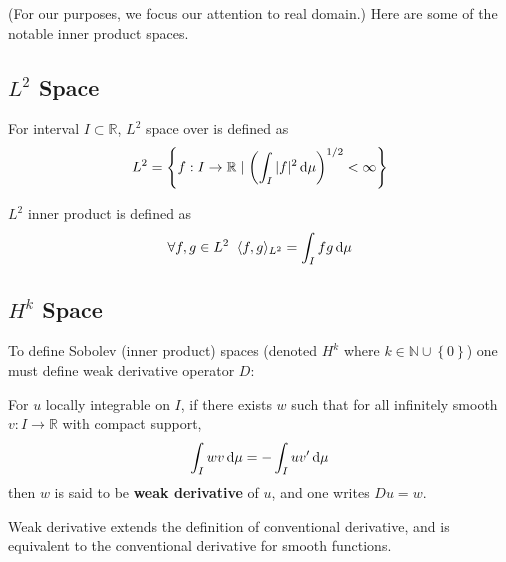 \documentclass[../dissertation.tex]{subfiles}
\begin{document}
(For our purposes, we focus our attention to real domain.)
Here are some of the notable inner product spaces.
\subsection{$L^2$ Space}
\begin{definition}[$L^2$ Space]
    For interval $I \subset \mathbb{R}$,
    $L^2$ space over is defined as
    \begin{equation}
        L^2 = \left\{ f:I \rightarrow \mathbb{R} \left.\middle|\right. \left( \int_{I} |f|^2 \, \text{d} \mu \right)^{1/2} < \infty \right\}
    \end{equation}

    $L^2$ inner product is defined as
    \begin{equation}
        \forall f,g \in L^2 \; \; \langle f, g \rangle_{L^2} = \int_I f g \, \text{d} \mu
    \end{equation}
\end{definition}

\subsection{$H^k$ Space}
To define Sobolev (inner product) spaces (denoted $H^k$ where $k \in \mathbb{N} \cup \left\{ 0 \right\}$)
one must define weak derivative operator $D$:
\begin{definition}
    For $u$ locally integrable on $I$, if there exists $w$ such that for all infinitely smooth $v:I \rightarrow \mathbb{R}$ with compact support,
    \begin{equation}
        \int_{I} w v \, \text{d} \mu = - \int_{I} u v' \, \text{d} \mu
    \end{equation}
    then $w$ is said to be \textbf{weak derivative} of $u$, and one writes $Du = w$.
\end{definition}

Weak derivative extends the definition of conventional derivative, and is equivalent to the conventional derivative for smooth functions.
\end{document}

